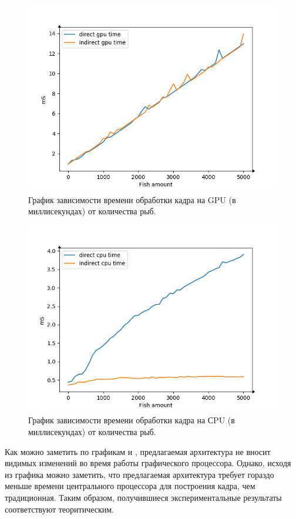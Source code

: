 	\begin{figure}[ht!] 
		\center
		\includegraphics [scale=0.8] {my_folder/images//gpu_plot}	
		\caption{График зависимости времени обработки кадра на GPU (в миллисекундах) от количества рыб.} 
		\label{fig:gpu_plot}
	\end{figure}

	\begin{figure}[ht!] 
		\center
		\includegraphics [scale=0.8] {my_folder/images//cpu_plot}	
		\caption{График зависимости времени обработки кадра на СPU (в миллисекундах) от количества рыб.} 
		\label{fig:cpu_plot}
	\end{figure}
	\FloatBarrier
	
	Как можно заметить по графикам  и , предлагаемая архитектура не вносит видимых изменений во время работы графического процессора. Однако, исходя из графика  можно заметить, что предлагаемая архитектура требует гораздо меньше времени центрального процессора для построения кадра, чем традиционная. Таким образом, получившиеся экспериментальные результаты соответствуют теоритическим. 
	
